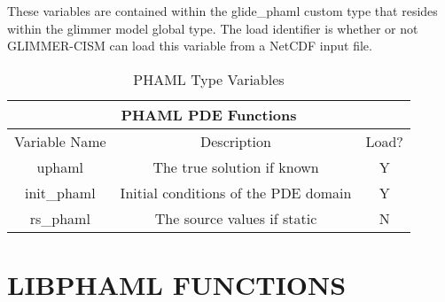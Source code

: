 These variables are contained within the glide\_phaml custom type that resides within the glimmer model global type.  The load identifier is whether or not GLIMMER-CISM can load this variable from a NetCDF input file.

\begin{table}[ht]
\caption{PHAML Type Variables}
\centering
\begin{center}
    \begin{tabular}{ | c | c | c |}
    \hline
    \multicolumn{3}{|c|}{PHAML PDE Functions}\\
    \hline
    Variable Name & Description & Load?\\ \hline
    uphaml & The true solution if known & Y\\ \hline
    init\_phaml & Initial conditions of the PDE domain & Y\\ \hline
    rs\_phaml & The source values if static & N \\ \hline
\end{tabular}
\end{center}
\end{table}

\section{LIBPHAML FUNCTIONS} \label{ch:libphamlfunc}

